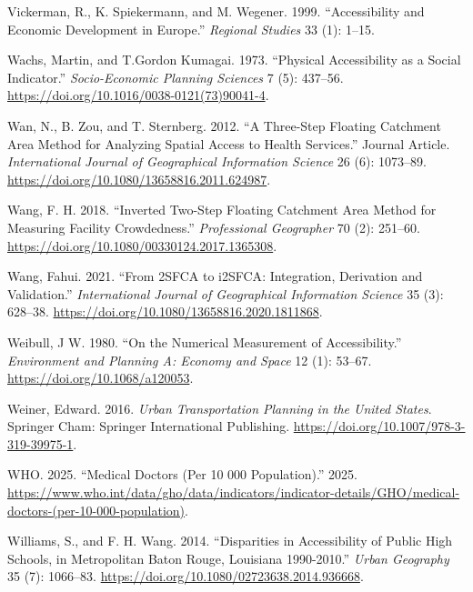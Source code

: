 \documentclass[
]{article}
\newlength{\cslhangindent}
\newenvironment{CSLReferences}[2] %
 {\begin{list}{}{%
  \setlength{\itemindent}{0pt}
  \setlength{\leftmargin}{0pt}
  \setlength{\parsep}{0pt}
  \ifodd #1
   \setlength{\leftmargin}{\cslhangindent}
   \setlength{\itemindent}{-1\cslhangindent}
  \fi
  \setlength{\itemsep}{#2\baselineskip}}}
 {\end{list}}
\begin{document}
\begin{CSLReferences}{1}{0}
Vickerman, R., K. Spiekermann, and M. Wegener. 1999. {``Accessibility
and Economic Development in {Europe}.''} \emph{Regional Studies} 33 (1):
1--15.

Wachs, Martin, and T.Gordon Kumagai. 1973. {``Physical Accessibility as
a Social Indicator.''} \emph{Socio-Economic Planning Sciences} 7 (5):
437--56. \url{https://doi.org/10.1016/0038-0121(73)90041-4}.

Wan, N., B. Zou, and T. Sternberg. 2012. {``A Three-Step Floating
Catchment Area Method for Analyzing Spatial Access to Health
Services.''} Journal Article. \emph{International Journal of
Geographical Information Science} 26 (6): 1073--89.
\url{https://doi.org/10.1080/13658816.2011.624987}.

Wang, F. H. 2018. {``Inverted {Two}-{Step} {Floating} {Catchment} {Area}
{Method} for {Measuring} {Facility} {Crowdedness}.''} \emph{Professional
Geographer} 70 (2): 251--60.
\url{https://doi.org/10.1080/00330124.2017.1365308}.

Wang, Fahui. 2021. {``From {2SFCA} to {i2SFCA}: Integration, Derivation
and Validation.''} \emph{International Journal of Geographical
Information Science} 35 (3): 628--38.
\url{https://doi.org/10.1080/13658816.2020.1811868}.

Weibull, J W. 1980. {``On the Numerical Measurement of Accessibility.''}
\emph{Environment and Planning A: Economy and Space} 12 (1): 53--67.
\url{https://doi.org/10.1068/a120053}.

Weiner, Edward. 2016. \emph{Urban Transportation Planning in the United
States}. Springer Cham: Springer International Publishing.
\url{https://doi.org/10.1007/978-3-319-39975-1}.

WHO. 2025. {``Medical Doctors (Per 10 000 Population).''} 2025.
\url{https://www.who.int/data/gho/data/indicators/indicator-details/GHO/medical-doctors-(per-10-000-population)}.

Williams, S., and F. H. Wang. 2014. {``Disparities in Accessibility of
Public High Schools, in Metropolitan {Baton} {Rouge}, {Louisiana}
1990-2010.''} \emph{Urban Geography} 35 (7): 1066--83.
\url{https://doi.org/10.1080/02723638.2014.936668}.


\end{CSLReferences}
\end{document}
